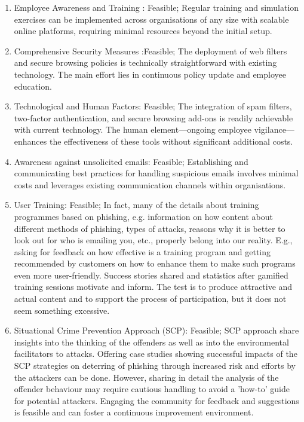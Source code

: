 \begin{enumerate}
    \item Employee Awareness and Training : Feasible; Regular training and simulation exercises can be implemented across organisations of any size with scalable online platforms, requiring minimal resources beyond the initial setup.
    \item Comprehensive Security Measures :Feasible; The deployment of web filters and secure browsing policies is technically straightforward with existing technology. The main effort lies in continuous policy update and employee education.
    \item Technological and Human Factors: Feasible; The integration of spam filters, two-factor authentication, and secure browsing add-ons is readily achievable with current technology. The human element—ongoing employee vigilance—enhances the effectiveness of these tools without significant additional costs.
    \item Awareness against unsolicited emails: Feasible; Establishing and communicating best practices for handling suspicious emails involves minimal costs and leverages existing communication channels within organisations.

     \item User Training: Feasible; In fact, many of the details about training programmes based on phishing, e.g. information on how content about different methods of phishing, types of attacks, reasons why it is better to look out for who is emailing you, etc., properly belong into our reality. E.g., asking for feedback on how effective is a training program and getting recommended by customers on how to enhance them to make such programs even more user-friendly. Success stories shared and statistics after gamified training sessions motivate and inform. The test is to produce attractive and actual content and to support the process of participation, but it does not seem something excessive.
     
     \item Situational Crime Prevention Approach (SCP): Feasible;  SCP approach share insights into the thinking of the offenders as well as into the environmental facilitators to attacks. Offering case studies showing successful impacts of the SCP strategies on deterring of phishing through increased risk and efforts by the attackers can be done. However, sharing in detail the analysis of the offender behaviour may require cautious handling to avoid a 'how-to' guide for potential attackers. Engaging the community for feedback and suggestions is feasible and can foster a continuous improvement environment.
     

\end{enumerate}
